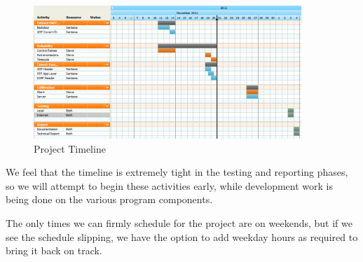 \documentclass[titlepage]{article}
\begin{document}
\begin{figure}[htb]                                                                       
  \begin{center}
    \includegraphics[width=0.9\textwidth]{imgs/timeline.png}
  \end{center}
  \caption{Project Timeline}
  \label{fig:timeline}
\end{figure}

We feel that the timeline is extremely tight in the testing and reporting phases, so we will attempt to begin these activities early, while development work is being done on the various
program components.

The only times we can firmly schedule for the project are on weekends, but if we see the schedule slipping, we have the option to add weekday hours as required to bring it back on
track.
\end{document}
